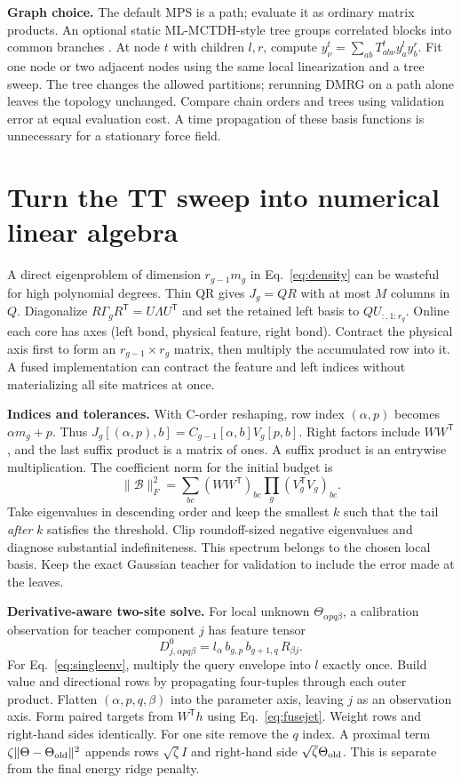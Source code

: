 \documentclass[11pt,a4paper]{article}
\newcommand{\T}{\mathsf T}\newcommand{\tr}{\operatorname{tr}}
\begin{document}
\textbf{Graph choice.} The default MPS is a path; evaluate it as ordinary matrix products. An optional static ML-MCTDH-style tree groups correlated blocks into common branches \cite{potfit}. At node $t$ with children $l,r$, compute $y^t_\nu=\sum_{ab}T^t_{ab\nu}y^l_a y^r_b$. Fit one node or two adjacent nodes using the same local linearization and a tree sweep. The tree changes the allowed partitions; rerunning DMRG on a path alone leaves the topology unchanged. Compare chain orders and trees using validation error at equal evaluation cost. A time propagation of these basis functions is unnecessary for a stationary force field.

\pg\section{Turn the TT sweep into numerical linear algebra}\label{sec:code_sweep}
A direct eigenproblem of dimension $r_{g-1}m_g$ in Eq.~\eqref{eq:density} can be wasteful for high polynomial degrees. Thin QR gives $J_g=Q R$ with at most $M$ columns in $Q$. Diagonalize $R\Gamma_gR^\T=U\Lambda U^\T$ and set the retained left basis to $QU_{:,1:r_g}$. Online each core has axes (left bond, physical feature, right bond). Contract the physical axis first to form an $r_{g-1}\times r_g$ matrix, then multiply the accumulated row into it. A fused implementation can contract the feature and left indices without materializing all site matrices at once.

\textbf{Indices and tolerances.} With C-order reshaping, row index $(\alpha,p)$ becomes $\alpha m_g+p$. Thus $J_g[(\alpha,p),b]=C_{g-1}[\alpha,b]V_g[p,b]$. Right factors include $WW^\T$, and the last suffix product is a matrix of ones. A suffix product is an entrywise multiplication. The coefficient norm for the initial budget is
\[
 \|\mathcal B\|_F^2=\sum_{bc}(WW^\T)_{bc}\prod_g (V_g^\T V_g)_{bc}.
\]
Take eigenvalues in descending order and keep the smallest $k$ such that the tail \emph{after} $k$ satisfies the threshold. Clip roundoff-sized negative eigenvalues and diagnose substantial indefiniteness. This spectrum belongs to the chosen local basis. Keep the exact Gaussian teacher for validation to include the error made at the leaves.

\textbf{Derivative-aware two-site solve.} For local unknown $\Theta_{\alpha p q\beta}$, a calibration observation for teacher component $j$ has feature tensor
\[
 D^0_{j,\alpha p q\beta}
    = l_\alpha\,b_{g,p}\,b_{g+1,q}\,R_{\beta j}.
\]
For Eq.~\eqref{eq:singleenv}, multiply the query envelope into $l$ exactly once. Build value and directional rows by propagating four-tuples through each outer product. Flatten $(\alpha,p,q,\beta)$ into the parameter axis, leaving $j$ as an observation axis. Form paired targets from $W^\T h$ using Eq.~\eqref{eq:fusejet}. Weight rows and right-hand sides identically. For one site remove the $q$ index. A proximal term $\zeta\|\Theta-\Theta_{\rm old}\|^2$ appends rows $\sqrt{\zeta}I$ and right-hand side $\sqrt{\zeta}\Theta_{\rm old}$. This is separate from the final energy ridge penalty.
\end{document}
